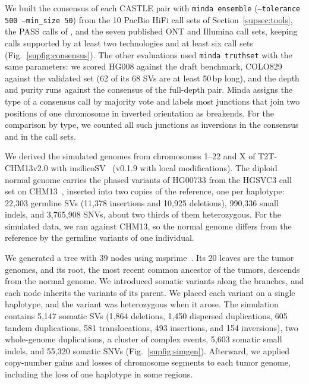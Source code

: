 We built the consensus of each CASTLE pair with \texttt{minda ensemble} (\texttt{--tolerance 500 --min\_size 50}) from the 10 PacBio HiFi call sets of Section~\ref{supsec:tools}, the PASS calls of \tool{}, and the seven published ONT and Illumina call sets, keeping calls supported by at least two technologies and at least six call sets (Fig.~\ref{supfig:consensus}).
The other evaluations used \texttt{minda truthset} with the same parameters: we scored HG008 against the draft benchmark, COLO829 against the validated set (62 of its 68 SVs are at least 50\,bp long), and the depth and purity runs against the consensus of the full-depth pair.
Minda assigns the type of a consensus call by majority vote and labels most junctions that join two positions of one chromosome in inverted orientation as breakends.
For the comparison by type, we counted all such junctions as inversions in the consensus and in the call sets.


We derived the simulated genomes from chromosomes 1--22 and X of T2T-CHM13v2.0 with insilicoSV~\cite{Battistella_2025} (v0.1.9 with local modifications).
The diploid normal genome carries the phased variants of HG00733 from the HGSVC3 call set on CHM13~\cite{hgsvc3}, inserted into two copies of the reference, one per haplotype: 22,303 germline SVs (11,378 insertions and 10,925 deletions), 990,336 small indels, and 3,765,908 SNVs, about two thirds of them heterozygous.
For the simulated data, we ran \tool{} against CHM13, so the normal genome differs from the reference by the germline variants of one individual.

We generated a tree with 39 nodes using msprime~\cite{msprime}.
Its 20 leaves are the tumor genomes, and its root, the most recent common ancestor of the tumors, descends from the normal genome.
We introduced somatic variants along the branches, and each node inherits the variants of its parent.
We placed each variant on a single haplotype, and the variant was heterozygous when it arose.
The simulation contains 5,147 somatic SVs (1,864 deletions, 1,450 dispersed duplications, 605 tandem duplications, 581 translocations, 493 insertions, and 154 inversions), two whole-genome duplications, a cluster of complex events, 5,603 somatic small indels, and 55,320 somatic SNVs (Fig.~\ref{supfig:simgen}).
Afterward, we applied copy-number gains and losses of chromosome segments to each tumor genome, including the loss of one haplotype in some regions.

